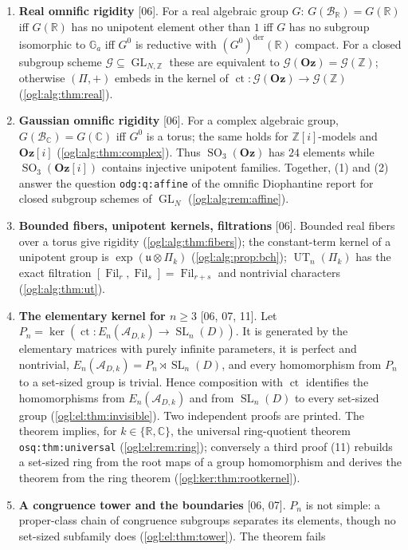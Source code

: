 \documentclass[11pt,oneside]{article}
\numberwithin{equation}{section}
\theoremstyle{definition}
\theoremstyle{remark}
\newcommand{\Oz}{\mathbf{Oz}}
\newcommand{\GOz}{\mathbf{Oz}[i]}
\newcommand{\Z}{\mathbb Z}
\newcommand{\R}{\mathbb R}
\newcommand{\C}{\mathbb C}
\newcommand{\A}{\mathcal A}
\newcommand{\BR}{\mathcal B_{\R}}
\newcommand{\BC}{\mathcal B_{\C}}
\newcommand{\cG}{\mathcal G}
\newcommand{\Ga}{\mathbb G_a}
\newcommand{\ct}{\operatorname{ct}}
\newcommand{\GL}{\operatorname{GL}}
\newcommand{\SL}{\operatorname{SL}}
\newcommand{\SO}{\operatorname{SO}}
\newcommand{\UT}{\operatorname{UT}}
\newcommand{\Fil}{\operatorname{Fil}}
\newcommand{\der}{\mathrm{der}}
\newcommand{\src}[1]{\textup{\textsf{\small[#1]}}}
\newcommand{\replabel}[1]{\nolinkurl{#1}}
\begin{document}
\begin{enumerate}[label=\textup{(\arabic*)},leftmargin=*,itemsep=3pt]
\item \textbf{Real omnific rigidity} \src{06}. For a real algebraic group $G$:
$G(\BR)=G(\R)$ iff $G(\R)$ has no unipotent element other than $1$ iff $G$ has
no subgroup isomorphic to $\Ga$ iff $G^0$ is reductive with $(G^0)^{\der}(\R)$
compact. For a closed subgroup scheme $\cG\subseteq\GL_{N,\Z}$ these are
equivalent to $\cG(\Oz)=\cG(\Z)$; otherwise $(\Pi,+)$ embeds in the kernel of
$\ct:\cG(\Oz)\to\cG(\Z)$ (\cref{ogl:alg:thm:real}).
\item \textbf{Gaussian omnific rigidity} \src{06}. For a complex algebraic group,
$G(\BC)=G(\C)$ iff $G^0$ is a torus; the same holds for $\Z[i]$-models and
$\GOz$ (\cref{ogl:alg:thm:complex}). Thus $\SO_3(\Oz)$ has $24$ elements
while $\SO_3(\GOz)$ contains injective unipotent families. Together, (1) and
(2) answer the question \replabel{odg:q:affine} of the omnific Diophantine
report for closed subgroup schemes of $\GL_N$ (\cref{ogl:alg:rem:affine}).
\item \textbf{Bounded fibers, unipotent kernels, filtrations} \src{06}. Bounded
real fibers over a torus give rigidity (\cref{ogl:alg:thm:fibers}); the
constant-term kernel of a unipotent group is $\exp(\mathfrak u\otimes\Pi_k)$
(\cref{ogl:alg:prop:bch}); $\UT_n(\Pi_k)$ has the exact filtration
$[\Fil_r,\Fil_s]=\Fil_{r+s}$ and nontrivial characters
(\cref{ogl:alg:thm:ut}).
\item \textbf{The elementary kernel for $n\ge3$} \src{06, 07, 11}. Let
$P_n=\ker(\ct:E_n(\A_{D,k})\to\SL_n(D))$. It is generated by the elementary
matrices with purely infinite parameters, it is perfect and nontrivial,
$E_n(\A_{D,k})=P_n\rtimes\SL_n(D)$, and every homomorphism from $P_n$ to a
set-sized group is trivial. Hence composition with $\ct$ identifies the
homomorphisms from $E_n(\A_{D,k})$ and from $\SL_n(D)$ to every set-sized group
(\cref{ogl:el:thm:invisible}). Two independent proofs are printed. The theorem
implies, for $k\in\{\R,\C\}$, the universal ring-quotient theorem
\replabel{osq:thm:universal} (\cref{ogl:el:rem:ring}); conversely a third
proof (11) rebuilds a set-sized ring from the root maps of a group
homomorphism and derives the theorem from the ring theorem
(\cref{ogl:ker:thm:rootkernel}).
\item \textbf{A congruence tower and the boundaries} \src{06, 07}. $P_n$ is not
simple: a proper-class chain of congruence subgroups separates its elements,
though no set-sized subfamily does (\cref{ogl:el:thm:tower}). The theorem fails

\end{enumerate}
\end{document}
